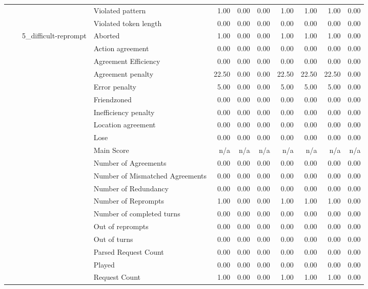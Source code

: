 \begin{tabular}{llllrrrrrrr}
 &  &  & Violated pattern & 1.00 & 0.00 & 0.00 & 1.00 & 1.00 & 1.00 & 0.00 \\
 &  &  & Violated token length & 0.00 & 0.00 & 0.00 & 0.00 & 0.00 & 0.00 & 0.00 \\
\cline{3-11}
 &  & \multirow[t]{27}{*}{5_difficult-reprompt} & Aborted & 1.00 & 0.00 & 0.00 & 1.00 & 1.00 & 1.00 & 0.00 \\
 &  &  & Action agreement & 0.00 & 0.00 & 0.00 & 0.00 & 0.00 & 0.00 & 0.00 \\
 &  &  & Agreement Efficiency & 0.00 & 0.00 & 0.00 & 0.00 & 0.00 & 0.00 & 0.00 \\
 &  &  & Agreement penalty & 22.50 & 0.00 & 0.00 & 22.50 & 22.50 & 22.50 & 0.00 \\
 &  &  & Error penalty & 5.00 & 0.00 & 0.00 & 5.00 & 5.00 & 5.00 & 0.00 \\
 &  &  & Friendzoned & 0.00 & 0.00 & 0.00 & 0.00 & 0.00 & 0.00 & 0.00 \\
 &  &  & Inefficiency penalty & 0.00 & 0.00 & 0.00 & 0.00 & 0.00 & 0.00 & 0.00 \\
 &  &  & Location agreement & 0.00 & 0.00 & 0.00 & 0.00 & 0.00 & 0.00 & 0.00 \\
 &  &  & Lose & 0.00 & 0.00 & 0.00 & 0.00 & 0.00 & 0.00 & 0.00 \\
 &  &  & Main Score & n/a & n/a & n/a & n/a & n/a & n/a & n/a \\
 &  &  & Number of Agreements & 0.00 & 0.00 & 0.00 & 0.00 & 0.00 & 0.00 & 0.00 \\
 &  &  & Number of Mismatched Agreements & 0.00 & 0.00 & 0.00 & 0.00 & 0.00 & 0.00 & 0.00 \\
 &  &  & Number of Redundancy & 0.00 & 0.00 & 0.00 & 0.00 & 0.00 & 0.00 & 0.00 \\
 &  &  & Number of Reprompts & 1.00 & 0.00 & 0.00 & 1.00 & 1.00 & 1.00 & 0.00 \\
 &  &  & Number of completed turns & 0.00 & 0.00 & 0.00 & 0.00 & 0.00 & 0.00 & 0.00 \\
 &  &  & Out of reprompts & 0.00 & 0.00 & 0.00 & 0.00 & 0.00 & 0.00 & 0.00 \\
 &  &  & Out of turns & 0.00 & 0.00 & 0.00 & 0.00 & 0.00 & 0.00 & 0.00 \\
 &  &  & Parsed Request Count & 0.00 & 0.00 & 0.00 & 0.00 & 0.00 & 0.00 & 0.00 \\
 &  &  & Played & 0.00 & 0.00 & 0.00 & 0.00 & 0.00 & 0.00 & 0.00 \\
 &  &  & Request Count & 1.00 & 0.00 & 0.00 & 1.00 & 1.00 & 1.00 & 0.00 \\

\end{tabular}
